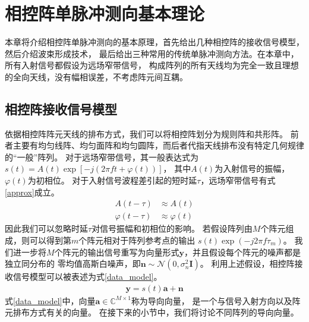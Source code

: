 \documentclass[master]{thesis-uestc}
\begin{document}
\chapter{相控阵单脉冲测向基本理论}
本章将介绍相控阵单脉冲测向的基本原理，首先给出几种相控阵的接收信号模型，然后介绍波束形成技术，
最后给出三种常用的传统单脉冲测向方法。在本章中，所有入射信号都假设为远场窄带信号，
构成阵列的所有天线均为完全一致且理想的全向天线，没有幅相误差，不考虑阵元间互耦。

\section{相控阵接收信号模型}
依据相控阵阵元天线的排布方式，我们可以将相控阵划分为规则阵和共形阵。
前者主要有均匀线阵、均匀面阵和均匀圆阵，而后者代指天线排布没有特定几何规律的“一般”阵列。
对于远场窄带信号，其一般表达式为$s(t)=A(t)\exp\left[-j\left(2\pi ft+\varphi(t)\right)\right]$，
其中$A(t)$为入射信号的振幅，$\varphi(t)$为初相位。
对于入射信号波程差引起的短时延$\tau$，远场窄带信号有式\eqref{approx}成立。
\begin{equation}\label{approx}
\begin{aligned}
    A(t-\tau) &\approx A(t) \\
    \varphi(t-\tau) &\approx \varphi(t)
\end{aligned}
\end{equation}
因此我们可以忽略时延$\tau$对信号振幅和初相位的影响。
若假设阵列由$M$个阵元组成，则可以得到第$m$个阵元相对于阵列参考点的输出
$s(t)\exp\left(-j2\pi f\tau_m\right)$。
我们进一步将$M$个阵元的输出信号重写为向量形式$\bm{y}$，并且假设每个阵元的噪声都是独立同分布的
零均值高斯白噪声，即$\bm{n}\sim\mathcal{N}\left(0,\sigma^2_n\bm{I}\right)$。
利用上述假设，相控阵接收信号模型可以被表述为式\eqref{data_model}。
\begin{equation}\label{data_model}
    \begin{aligned}
        \bm{y} = s(t)\bm{a} + \bm{n}
    \end{aligned}
\end{equation}
式\eqref{data_model}中，向量$\bm{a}\in\mathbb{C}^{M\times1}$称为导向向量，
是一个与信号入射方向以及阵元排布方式有关的向量。
在接下来的小节中，我们将讨论不同阵列的导向向量。
\end{document}
